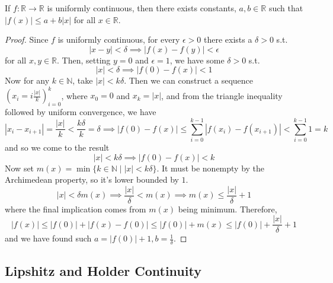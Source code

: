   \begin{theorem}
    If $f: \mathbb{R} \to \mathbb{R}$ is uniformly continuous, then there exists constants, $a, b \in \mathbb{R}$ such that $|f(x)| \leq a + b|x|$ for all $x \in \mathbb{R}$. 
  \end{theorem}
  \begin{proof}
    Since $f$ is uniformly continuous, for every $\epsilon > 0$ there exists a $\delta > 0$ s.t. 
    \begin{equation}
      |x - y| < \delta \implies |f(x) - f(y)| < \epsilon
    \end{equation}
    for all $x, y \in \mathbb{R}$. Then, setting $y = 0$ and $\epsilon = 1$, we have some $\delta > 0$ s.t. 
    \begin{equation}
      |x| < \delta \implies |f(0) - f(x)| < 1
    \end{equation}
    Now for any $k \in \mathbb{N}$, take $|x| < k \delta$. Then we can construct a sequence $(x_i = i \frac{|x|}{k})_{i = 0}^{k}$, where $x_0 = 0$ and $x_k = |x|$, and from the triangle inequality followed by uniform convergence, we have 
    \begin{equation}
      |x_i - x_{i+1}| = \frac{|x|}{k} < \frac{k\delta}{k} = \delta \implies |f(0) - f(x)| \leq \sum_{i=0}^{k - 1} |f(x_i) - f(x_{i+1})| < \sum_{i=0}^{k-1} 1 = k
    \end{equation} 
    and so we come to the result 
    \begin{equation}
      |x| < k \delta \implies |f(0) - f(x)| < k
    \end{equation}
    Now set $m(x) = \min \{ k \in \mathbb{N} \mid |x| < k \delta \}$. It must be nonempty by the Archimedean property, so it's lower bounded by $1$. 
    \begin{equation}
      |x| < \delta m(x) \implies \frac{|x|}{\delta} < m(x) \implies m(x) \leq \frac{|x|}{\delta} + 1
    \end{equation}
    where the final implication comes from $m(x)$ being minimum. Therefore, 
    \begin{equation}
      |f(x)| \leq |f(0)| + |f(x) - f(0)| \leq |f(0)| + m(x) \leq |f(0)| + \frac{|x|}{\delta} + 1
    \end{equation} 
    and we have found such $a = |f(0)| + 1, b = \frac{1}{\delta}$. 
  \end{proof}

\subsection{Lipshitz and Holder Continuity}

